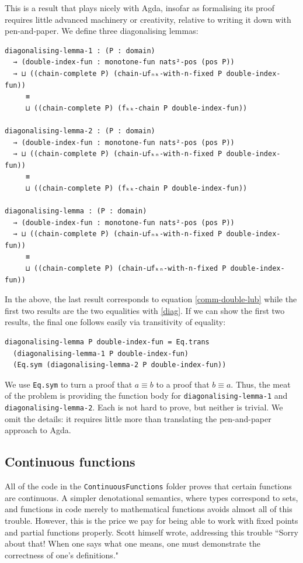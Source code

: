 \documentclass[12pt,a4paper,twoside,openright]{report}
\begin{document}
This is a result that plays nicely with Agda, insofar as formalising its proof requires little advanced machinery or creativity, relative to writing it down with pen-and-paper. We define three diagonalising lemmas:
\begin{verbatim}
diagonalising-lemma-1 : (P : domain) 
  → (double-index-fun : monotone-fun nats²-pos (pos P))
  → ⊔ ((chain-complete P) (chain-⊔fₙₖ-with-n-fixed P double-index-fun)) 
     ≡ 
     ⊔ ((chain-complete P) (fₖₖ-chain P double-index-fun))

diagonalising-lemma-2 : (P : domain) 
  → (double-index-fun : monotone-fun nats²-pos (pos P))
  → ⊔ ((chain-complete P) (chain-⊔fₖₙ-with-n-fixed P double-index-fun)) 
     ≡ 
     ⊔ ((chain-complete P) (fₖₖ-chain P double-index-fun))

diagonalising-lemma : (P : domain) 
  → (double-index-fun : monotone-fun nats²-pos (pos P))
  → ⊔ ((chain-complete P) (chain-⊔fₙₖ-with-n-fixed P double-index-fun)) 
     ≡ 
     ⊔ ((chain-complete P) (chain-⊔fₖₙ-with-n-fixed P double-index-fun))
\end{verbatim}
In the above, the last result corresponds to equation \ref{comm-double-lub} while the first two results are the two equalities with \ref{diag}. If we can show the first two results, the final one follows easily via transitivity of equality:
\begin{verbatim}
diagonalising-lemma P double-index-fun = Eq.trans 
  (diagonalising-lemma-1 P double-index-fun) 
  (Eq.sym (diagonalising-lemma-2 P double-index-fun))
\end{verbatim}
We use \texttt{Eq.sym} to turn a proof that $a\equiv b$ to a proof that $b \equiv a$. Thus, the meat of the problem is providing the function body for \texttt{diagonalising-lemma-1} and \texttt{diagonalising-lemma-2}. Each is not hard to prove, but neither is trivial. We omit the details: it requires little more than translating the pen-and-paper approach to Agda. 
\subsection{Continuous functions}
All of the code in the \texttt{ContinuousFunctions} folder proves that certain functions are continuous. A simpler denotational semantics, where types correspond to sets, and functions in code merely to mathematical functions avoids almost all of this trouble. However, this is the price we pay for being able to work with fixed points and partial functions properly. Scott himself wrote, addressing this trouble ``Sorry about that! When one says what one means, one must demonstrate the correctness of one’s definitions." 
\end{document}
